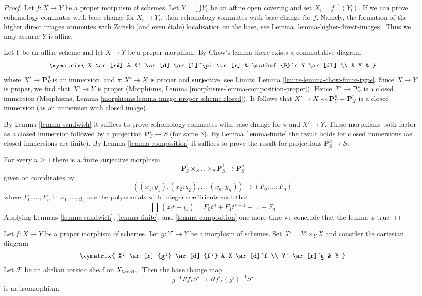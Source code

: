 \begin{proof}
Let $f : X \to Y$ be a proper morphism of schemes.
Let $Y = \bigcup Y_i$ be an affine open covering
and set $X_i = f^{-1}(Y_i)$. If we can prove
cohomology commutes with base change for $X_i \to Y_i$,
then cohomology commutes with base change for $f$.
Namely, the formation of the higher direct images
commutes with Zariski (and even \'etale) localization
on the base, see
Lemma \ref{lemma-higher-direct-images}.
Thus we may assume $Y$ is affine.

\medskip\noindent
Let $Y$ be an affine scheme and let $X \to Y$ be a proper morphism.
By Chow's lemma there exists a commutative diagram
$$
\xymatrix{
X \ar[rd] & X' \ar[d] \ar[l]^\pi \ar[r] & \mathbf{P}^n_Y \ar[dl] \\
& Y &
}
$$
where $X' \to \mathbf{P}^n_Y$ is an immersion, and
$\pi : X' \to X$ is proper and surjective, see
Limits, Lemma \ref{limits-lemma-chow-finite-type}.
Since $X \to Y$ is proper, we find that $X' \to Y$ is proper
(Morphisms, Lemma \ref{morphisms-lemma-composition-proper}).
Hence $X' \to \mathbf{P}^n_Y$ is a closed immersion
(Morphisms, Lemma \ref{morphisms-lemma-image-proper-scheme-closed}).
It follows that $X' \to X \times_Y \mathbf{P}^n_Y = \mathbf{P}^n_X$
is a closed immersion (as an immersion with closed image).

\medskip\noindent
By Lemma \ref{lemma-sandwich}
it suffices to prove cohomology commutes with base change for
$\pi$ and $X' \to Y$. These morphisms both factor as a closed
immersion followed by a projection $\mathbf{P}^n_S \to S$ (for some $S$).
By Lemma \ref{lemma-finite} the result holds for closed
immersions (as closed immersions are finite).
By Lemma \ref{lemma-composition} it suffices to prove the
result for projections $\mathbf{P}^n_S \to S$.

\medskip\noindent
For every $n \geq 1$ there is a finite surjective morphism
$$
\mathbf{P}^1_S \times_S \ldots \times_S \mathbf{P}^1_S
\longrightarrow
\mathbf{P}^n_S
$$
given on coordinates by
$$
((x_1 : y_1), (x_2 : y_2), \ldots, (x_n : y_n))
\longmapsto
(F_0 : \ldots : F_n)
$$
where $F_0, \ldots, F_n$ in $x_1, \ldots, y_n$
are the polynomials with integer coefficients such that
$$
\prod (x_i t + y_i) = F_0 t^n + F_1 t^{n - 1} + \ldots + F_n
$$
Applying
Lemmas \ref{lemma-sandwich}, \ref{lemma-finite}, and \ref{lemma-composition}
one more time we conclude that the lemma is true.
\end{proof}

\begin{theorem}
\label{theorem-proper-base-change}
Let $f : X \to Y$ be a proper morphism of schemes. Let $g : Y' \to Y$ be
a morphism of schemes. Set $X' = Y' \times_Y X$
and consider the cartesian diagram
$$
\xymatrix{
X' \ar[r]_{g'} \ar[d]_{f'} & X \ar[d]^f \\
Y' \ar[r]^g & Y
}
$$
Let $\mathcal{F}$ be an abelian torsion sheaf on $X_\etale$.
Then the base change map
$$
g^{-1}Rf_*\mathcal{F} \longrightarrow Rf'_*(g')^{-1}\mathcal{F}
$$
is an isomorphism.
\end{theorem}

